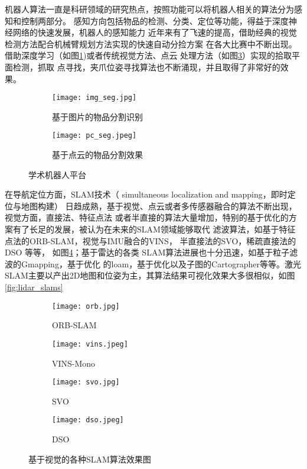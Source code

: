 机器人算法一直是科研领域的研究热点，按照功能可以将机器人相关的算法分为感知和控制两部分。
感知方向包括物品的检测、分类、定位等功能，得益于深度神经网络的快速发展，机器人的感知能力
近年来有了飞速的提高，借助经典的视觉检测方法配合机械臂规划方法实现的快速自动分捡方案
在各大比赛中不断出现。借助深度学习（如图\ref{fig:img_seg})或者传统视觉方法、点云
处理方法（如图\ref{fig:pc_seg}）实现的拾取平面检测，抓取
点寻找，夹爪位姿寻找算法也不断涌现，并且取得了非常好的效果。

\begin{figure}
\centering
\begin{subfigure}{.6\textwidth}
  \centering
  \texttt{[image: img\_seg.jpg]}
  \caption{基于图片的物品分割识别}
  \label{fig:img_seg}
\end{subfigure}%
\begin{subfigure}{.4\textwidth}
  \centering
  \texttt{[image: pc\_seg.jpeg]}
  \caption{基于点云的物品分割效果}
  \label{fig:pc_seg}
\end{subfigure}
\caption{学术机器人平台}
\end{figure}


在导航定位方面，SLAM技术（ simultaneous localization and mapping，即时定位与地图构建）
日趋成熟，基于视觉、点云或者多传感器融合的算法不断出现，视觉方面，直接法、特征点法
或者半直接的算法大量增加，特别的基于优化的方案有了长足的发展，被认为在未来的SLAM领域能够取代
滤波算法，如基于特征点法的ORB-SLAM\cite{mur2015orb}，视觉与IMU融合的VINS\cite{qin2018vins}，
半直接法的SVO\cite{forster2014svo}，稀疏直接法的DSO\cite{engel2017direct} 等等，
如图\ref{fig:slams}；基于雷达的各类
SLAM算法进展也十分迅速，如基于粒子滤波的Gmapping\cite{grisettiyz2005improving}，基于优化
的loam\cite{zhang2014loam}，基于优化以及子图的Cartographer\cite{hess2016real}等等。激光
SLAM主要以产出2D地图和位姿为主，其算法结果可视化效果大多很相似，如图\ref{fig:lidar_slams}

\begin{figure}
\centering
\begin{subfigure}{.6\textwidth}
  \centering
  \texttt{[image: orb.jpg]}
  \caption{ORB-SLAM}
\end{subfigure}%
\begin{subfigure}{.4\textwidth}
  \centering
  \texttt{[image: vins.jpeg]}
  \caption{VINS-Mono}
\end{subfigure}
\begin{subfigure}{.5\textwidth}
  \centering
  \texttt{[image: svo.jpg]}
  \caption{SVO}
\end{subfigure}
\begin{subfigure}{.5\textwidth}
  \centering
  \texttt{[image: dso.jpeg]}
  \caption{DSO}
\end{subfigure}
\caption{基于视觉的各种SLAM算法效果图}
\label{fig:slams}
\end{figure}


